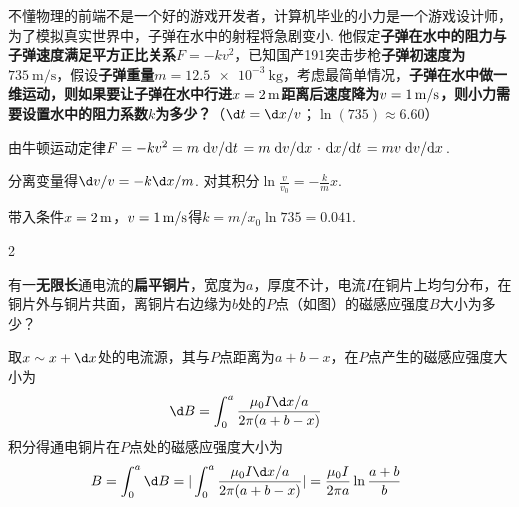 \documentclass[quiet, fontset = fandol, AutoFakeSlant, 10pt]{ctexart}
\let \emph \textbf
\begin{document}
\begin{problem}[本题6分]
    不懂物理的前端不是一个好的游戏开发者，计算机毕业的小力是一个游戏设计师，为了模拟真实世界中，子弹在水中的射程将急剧变小. 他假定\emph{子弹在水中的阻力与子弹速度满足平方正比关系$F=-kv^2$}，已知国产191突击步枪\emph{子弹初速度为$\qty{735}{\m/\s}$}，假设\emph{子弹重量$m=\qty{12.5e-3}\kg$}，考虑最简单情况，\emph{子弹在水中做一维运动，则如果要让子弹在水中行进$x=\qty2\m$距离后速度降为$v=\qty1{\m/\s}$，则小力需要设置水中的阻力系数$k$为多少？}（$\d t=\d x/v$；$\ln(735)\approx6.60$）
\end{problem}
\begin{solution}\leavevmode
    \begin{description}
        \item 由牛顿运动定律$F=-kv^2=m\odv v/t=m\odv v/x\cdot\odv x/t=mv\odv v/x$.
        \item 分离变量得$\d v/v=-k\d x/m$. 对其积分$\ln\frac v{v_0}=-\frac km x$.
        \item 带入条件$x=\qty2\m$，$v=\qty1{\m/\s}$得$k=m/x_0\ln735=0.041$.
    \end{description}
\end{solution}

\begin{paracol}{2}
\begin{problem}[本题6分]
    有一\emph{无限长}通电流的\emph{扁平铜片}，宽度为$a$，厚度不计，电流$I$在铜片上均匀分布，在铜片外与铜片共面，离铜片右边缘为$b$处的$P$点（如图）的磁感应强度$B$大小为多少？
    \switchcolumn\vspace*{\fill}
    \centering
    \vspace*{\fill}
\end{problem}
\end{paracol}
\begin{solution}
    取$x\sim x+\d x$处的电流源，其与$P$点距离为$a+b-x$，在$P$点产生的磁感应强度大小为
    \[\d B=\int_0^a\frac{\mu_0I\d x/a}{2\pi(a+b-x)}\tag*{}\]
    积分得通电铜片在$P$点处的磁感应强度大小为
    \[B=\int_0^a\d B=|\int_0^a\frac{\mu_0I\d x/a}{2\pi(a+b-x)}|=\frac{\mu_0I}{2\pi a}\ln\frac{a+b}{b}\tag*{}\]
\end{solution}
\end{document}
